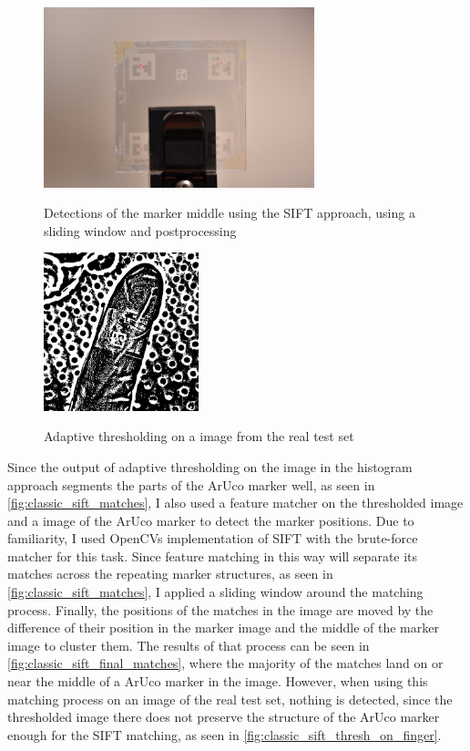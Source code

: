 \documentclass[10pt]{book}
\begin{document}
\begin{figure}
  \caption{Detections of the marker middle using the \ac{SIFT} approach, using a sliding window and postprocessing}
  \includegraphics[width=0.7\textwidth]{image/classic_sift_final_matches}
  \label{fig:classic_sift_final_matches}
\end{figure}

\begin{figure}
  \caption{Adaptive thresholding on a image from the real test set}
  \includegraphics[width=0.4\textwidth]{image/classic_sift_thresh_on_finger}
  \label{fig:classic_sift_thresh_on_finger}
\end{figure}

Since the output of adaptive thresholding on the image in the histogram approach segments the parts of the \ac{ArUco} marker well, as seen in \autoref{fig:classic_sift_matches}, I also used a feature matcher on the thresholded image and a image of the \ac{ArUco} marker to detect the marker positions. Due to familiarity, I used \acp{OpenCV} implementation of \ac{SIFT} with the brute-force matcher for this task. Since feature matching in this way will separate its matches across the repeating marker structures, as seen in \autoref{fig:classic_sift_matches}, I applied a sliding window around the matching process. Finally, the positions of the matches in the image are moved by the difference of their position in the marker image and the middle of the marker image to cluster them. The results of that process can be seen in \autoref{fig:classic_sift_final_matches}, where the majority of the matches land on or near the middle of a \ac{ArUco} marker in the image. However, when using this matching process on an image of the real test set, nothing is detected, since the thresholded image there does not preserve the structure of the \ac{ArUco} marker enough for the \ac{SIFT} matching, as seen in \autoref{fig:classic_sift_thresh_on_finger}.
\end{document}
